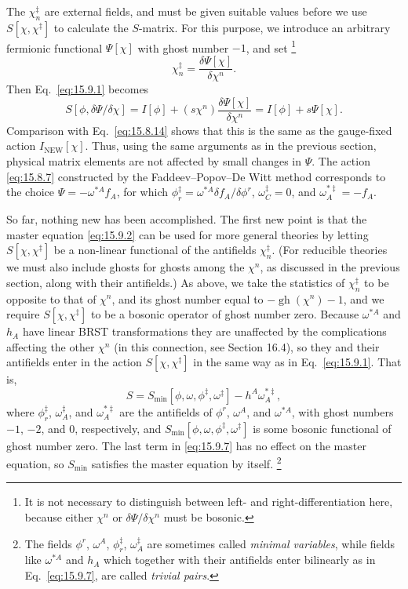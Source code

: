 The $\chi_n^{\ddagger}$ are external fields, and must be given suitable values
before we use $S[\chi,\chi^{\ddagger}]$ to calculate the $S$-matrix. For this
purpose, we introduce an arbitrary fermionic functional $\Psi[\chi]$ with
ghost number $-1$, and set
\footnote{It is not necessary to distinguish between left- and
right-differentiation here, because either $\chi^n$ or
$\delta\Psi/\delta\chi^n$ must be bosonic.}
\begin{equation}
\chi_n^{\ddagger}=\frac{\delta\Psi[\chi]}{\delta\chi^n}.
\tag{15.9.5}\label{eq:15.9.5}
\end{equation}
Then Eq.~\eqref{eq:15.9.1} becomes
\begin{equation}
S[\phi,\delta\Psi/\delta\chi]
=I[\phi]+(s\chi^n)\frac{\delta\Psi[\chi]}{\delta\chi^n}
=I[\phi]+s\Psi[\chi].
\tag{15.9.6}\label{eq:15.9.6}
\end{equation}
Comparison with Eq.~\eqref{eq:15.8.14} shows that this is the same as the
gauge-fixed action $I_{\mathrm{NEW}}[\chi]$. Thus, using the same arguments as
in the previous section, physical matrix elements are not affected by small
changes in $\Psi$. The action \eqref{eq:15.8.7} constructed by the
Faddeev--Popov--De Witt method corresponds to the choice
$\Psi=-\omega^{*A}f_A$, for which
$\phi_r^{\ddagger}=\omega^{*A}\delta f_A/\delta\phi^r$,
$\omega_C^{\ddagger}=0$, and $\omega_A^{*\ddagger}=-f_A$.

So far, nothing new has been accomplished. The first new point is that the
master equation \eqref{eq:15.9.2} can be used for more general theories by
letting $S[\chi,\chi^{\ddagger}]$ be a non-linear functional of the antifields
$\chi_n^{\ddagger}$. (For reducible theories we must also include ghosts for
ghosts among the $\chi^n$, as discussed in the previous section, along with
their antifields.) As above, we take the statistics of $\chi_n^{\ddagger}$ to
be opposite to that of $\chi^n$, and its ghost number equal to
$-\operatorname{gh}(\chi^n)-1$, and we require $S[\chi,\chi^{\ddagger}]$ to be
a bosonic operator of ghost number zero. Because $\omega^{*A}$ and $h_A$ have
linear BRST transformations they are unaffected by the complications affecting
the other $\chi^n$ (in this connection, see Section 16.4), so they and their
antifields enter in the action $S[\chi,\chi^{\ddagger}]$ in the same way as in
Eq.~\eqref{eq:15.9.1}. That is,
\begin{equation}
S=S_{\min}[\phi,\omega,\phi^{\ddagger},\omega^{\ddagger}]
  -h^A\omega_A^{*\ddagger},
\tag{15.9.7}\label{eq:15.9.7}
\end{equation}
where $\phi_r^{\ddagger}$, $\omega_A^{\ddagger}$, and
$\omega_A^{*\ddagger}$ are the antifields of $\phi^r$, $\omega^A$, and
$\omega^{*A}$, with ghost numbers $-1$, $-2$, and $0$, respectively, and
$S_{\min}[\phi,\omega,\phi^{\ddagger},\omega^{\ddagger}]$ is some bosonic
functional of ghost number zero. The last term in \eqref{eq:15.9.7} has no
effect on the master equation, so $S_{\min}$ satisfies the master equation by
itself.
\footnote{The fields $\phi^r$, $\omega^A$, $\phi_r^{\ddagger}$,
$\omega_A^{\ddagger}$ are sometimes called \emph{minimal variables}, while
fields like $\omega^{*A}$ and $h_A$ which together with their antifields enter
bilinearly as in Eq.~\eqref{eq:15.9.7}, are called \emph{trivial pairs}.}

